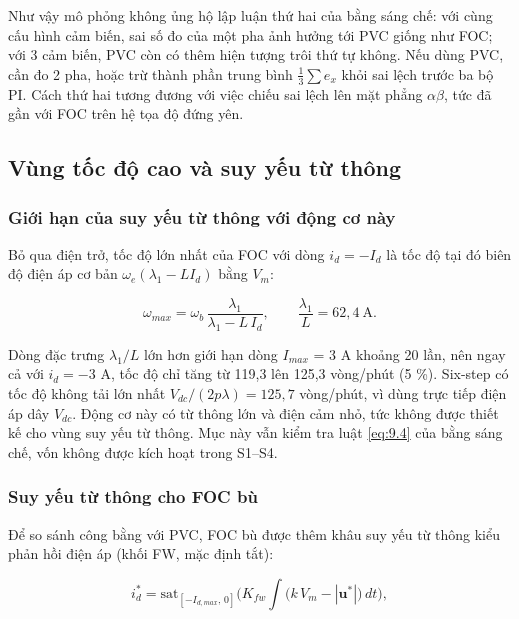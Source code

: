 Như vậy mô phỏng không ủng hộ lập luận thứ hai của bằng sáng chế: với cùng cấu hình cảm biến, sai số đo của một pha ảnh hưởng tới PVC giống như FOC; với 3 cảm biến, PVC còn có thêm hiện tượng trôi thứ tự không. Nếu dùng PVC, cần đo 2 pha, hoặc trừ thành phần trung bình $\tfrac13\sum e_x$ khỏi sai lệch trước ba bộ PI. Cách thứ hai tương đương với việc chiếu sai lệch lên mặt phẳng $\alpha\beta$, tức đã gần với FOC trên hệ tọa độ đứng yên.

\subsection{Vùng tốc độ cao và suy yếu từ thông}\label{sec:9.10}

\subsubsection{Giới hạn của suy yếu từ thông với động cơ này}\label{sec:9.10.1}

Bỏ qua điện trở, tốc độ lớn nhất của FOC với dòng $i_d = -I_d$ là tốc độ tại đó biên độ điện áp cơ bản $\omega_e(\lambda_1 - L I_d)$ bằng $V_m$:

\begin{equation}
\omega_{max} = \omega_b\,\frac{\lambda_1}{\lambda_1 - L\,I_d}, \qquad \frac{\lambda_1}{L} = 62{,}4\ \text{A}.
\tag{9.17}\label{eq:9.17}
\end{equation}

Dòng đặc trưng $\lambda_1/L$ lớn hơn giới hạn dòng $I_{max}$ = 3 A khoảng 20 lần, nên ngay cả với $i_d = -3$ A, tốc độ chỉ tăng từ 119,3 lên 125,3 vòng/phút (5 \%). Six-step có tốc độ không tải lớn nhất $V_{dc}/(2p\lambda) = 125{,}7$ vòng/phút, vì dùng trực tiếp điện áp dây $V_{dc}$. Động cơ này có từ thông lớn và điện cảm nhỏ, tức không được thiết kế cho vùng suy yếu từ thông. Mục này vẫn kiểm tra luật \eqref{eq:9.4} của bằng sáng chế, vốn không được kích hoạt trong S1–S4.

\subsubsection{Suy yếu từ thông cho FOC bù}\label{sec:9.10.2}

Để so sánh công bằng với PVC, FOC bù được thêm khâu suy yếu từ thông kiểu phản hồi điện áp (khối FW, mặc định tắt):

\begin{equation}
i_d^* = \mathrm{sat}_{[-I_{d,max},\,0]}\Big(K_{fw}\!\int \big(k\,V_m - |\mathbf{u}^*|\big)\,dt\Big),
\tag{9.18}\label{eq:9.18}
\end{equation}

